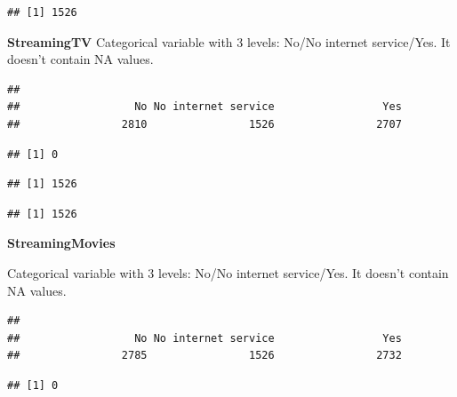 \documentclass[
  twoside]{article}
\newenvironment{Shaded}{\begin{snugshade}}{\end{snugshade}}
\newcommand{\CommentTok}[1]{\textcolor[rgb]{0.56,0.35,0.01}{\textit{#1}}}
\newcommand{\FunctionTok}[1]{\textcolor[rgb]{0.00,0.00,0.00}{#1}}
\newcommand{\NormalTok}[1]{#1}
\newcommand{\SpecialCharTok}[1]{\textcolor[rgb]{0.00,0.00,0.00}{#1}}
\newcommand{\StringTok}[1]{\textcolor[rgb]{0.31,0.60,0.02}{#1}}
\begin{document}
\begin{verbatim}
## [1] 1526
\end{verbatim}

\textbf{StreamingTV} Categorical variable with 3 levels: No/No internet
service/Yes. It doesn't contain NA values.

\begin{verbatim}
## 
##                  No No internet service                 Yes 
##                2810                1526                2707
\end{verbatim}

\begin{verbatim}
## [1] 0
\end{verbatim}

\begin{Shaded}
\end{Shaded}

\begin{verbatim}
## [1] 1526
\end{verbatim}

\begin{Shaded}
\end{Shaded}

\begin{verbatim}
## [1] 1526
\end{verbatim}

\textbf{StreamingMovies}

Categorical variable with 3 levels: No/No internet service/Yes. It
doesn't contain NA values.

\begin{verbatim}
## 
##                  No No internet service                 Yes 
##                2785                1526                2732
\end{verbatim}

\begin{verbatim}
## [1] 0
\end{verbatim}
\end{document}
